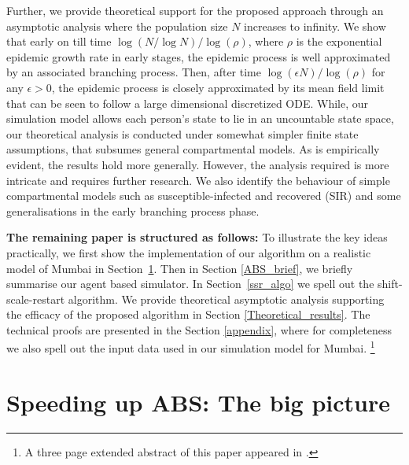 \documentclass{article}
\theoremstyle{definition}
\begin{document}
Further, we  provide theoretical support for the proposed approach through an asymptotic analysis where the population size $N$ increases to infinity. 
We
show that early on till time $\log (N/\log N)/\log (\rho)$, where $\rho$ is the exponential epidemic growth rate in early stages,   the epidemic process is well approximated by an associated  branching process.
Then, after time  $\log ( \epsilon N)/\log (\rho)$ for any $\epsilon >0$, the epidemic process is closely approximated by its mean field
limit that can be seen to follow a large dimensional discretized ODE.  While, our simulation model allows each person's state to lie in an uncountable state space,  our theoretical analysis is conducted under somewhat simpler finite state assumptions, that subsumes  general  compartmental models. 
As is empirically evident, the results hold more generally. However, the analysis required is more intricate and requires further research. 
We also identify the behaviour of simple compartmental models such as susceptible-infected and recovered (SIR) and some generalisations 
in the early branching process phase. 
 
 \textbf{The remaining paper is structured as follows:} 
 To illustrate the key ideas practically, we first show the implementation of our algorithm  on a realistic model of Mumbai in Section~\ref{section:big_picture}.
Then in Section \ref{ABS_brief}, we briefly   summarise our agent based simulator.  In Section~\ref{ssr_algo} we 
spell out the shift-scale-restart algorithm. 
We provide theoretical asymptotic analysis supporting the efficacy of the proposed algorithm in Section \ref{Theoretical_results}.
The technical proofs are presented in the  Section \ref{appendix}, where for completeness 
we also spell out the input data used in our simulation model for Mumbai. \footnote{A three page extended abstract of this paper appeared in \cite{sigmetricsposter}.}
 


\section{Speeding up ABS: The big picture}
\label{section:big_picture}
\end{document}
